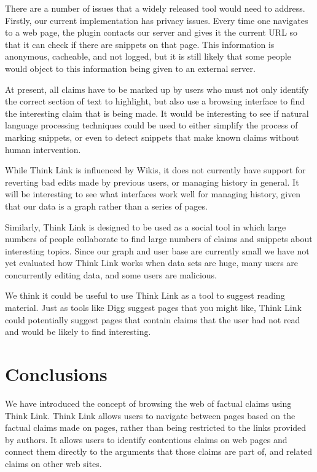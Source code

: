 \documentclass{chi2009}
\begin{document}
There are a number of issues that a widely released tool would need to address. Firstly, our current implementation has privacy issues. Every time one navigates to a web page, the plugin contacts our server and gives it the current URL so that it can check if there are snippets on that page. This information is anonymous, cacheable, and not logged, but it is still likely that some people would object to this information being given to an external server. 

At present, all claims have to be marked up by users who must not only identify the correct section of text to highlight, but also use a browsing interface to find the interesting claim that is being made. It would be interesting to see if natural language processing techniques could be used to either simplify the process of marking snippets, or even to detect snippets that make known claims without human intervention.

While Think Link is influenced by Wikis, it does not currently have support for reverting bad edits made by previous users, or managing history in general. It will be interesting to see what interfaces work well for managing history, given that our data is a graph rather than a series of pages.

Similarly, Think Link is designed to be used as a social tool in which large numbers of people collaborate to find large numbers of claims and snippets about interesting topics. Since our graph and user base are currently small we have not yet evaluated how Think Link works when data sets are huge, many users are concurrently editing data, and some users are malicious.

We think it could be useful to use Think Link as a tool to suggest reading material. Just as tools like Digg suggest pages that you might like, Think Link could potentially suggest pages that contain claims that the user had not read and would be likely to find interesting.


\section{Conclusions}

We have introduced the concept of browsing the web of factual claims using Think Link. Think Link allows users to navigate between pages based on the factual claims made on pages, rather than being restricted to the links provided by authors. It allows users to identify contentious claims on web pages and connect them directly to the arguments that those claims are part of, and related claims on other web sites.
\end{document}
